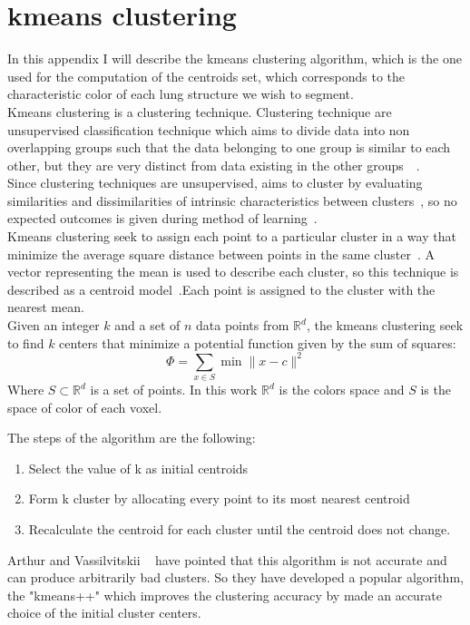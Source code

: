 \documentclass{standalone}
\begin{document}
	\chapter*{kmeans clustering}
	
	
	
	
	In this appendix I will describe the kmeans clustering algorithm, which is the one used for the computation of the centroids set, which corresponds to the characteristic color of each lung structure we wish to segment. \\
	Kmeans clustering is a clustering technique. Clustering technique are unsupervised classification technique which aims to divide data into non overlapping groups such that the data belonging to one group is similar to each other, but they are very distinct from data existing in the other groups~\cite{ART:Arshleen}~\cite{ART:Morisette}.\\ Since clustering techniques are unsupervised, aims to cluster by evaluating similarities and dissimilarities of intrinsic characteristics between clusters~\cite{ART:Morisette}, so no expected outcomes is given during method of learning~\cite{ART:Arshleen}.\\
	Kmeans clustering seek to assign each point to a particular cluster in a way that minimize the average square distance between points in the same cluster~\cite{Arthur2007}. A vector representing the mean is used to describe each cluster, so this technique is described as a centroid model~\cite{ART:Morisette}.Each point is assigned to the cluster with the nearest mean.\\
	
	Given an integer $k$ and a set of $n$ data points from $\mathbb{R}^d$, the kmeans clustering seek to find $k$ centers that minimize a potential function given by the sum of squares: 
	\begin{equation}
		\Phi = \sum_{x\in S}\min\| x - c\|^2
	\end{equation} 
	Where $S\subset \mathbb R^d$ is a set of points. In this work $\mathbb{R}^d$ is the colors space and $S$ is the space of color of each voxel.
	
	The steps of the algorithm are the following: 
	\begin{enumerate}
		\item Select the value of k as initial centroids
		\item Form k cluster by allocating every point to its most nearest centroid
		\item Recalculate the centroid for each cluster until the centroid does not change.

	\end{enumerate}
	
	Arthur and Vassilvitskii ~\cite{Arthur2007} have pointed that this algorithm is not accurate and can produce arbitrarily bad clusters. So they have developed a popular algorithm, the "kmeans++" which improves the clustering accuracy by made an accurate choice of the initial cluster centers. 
\end{document}
